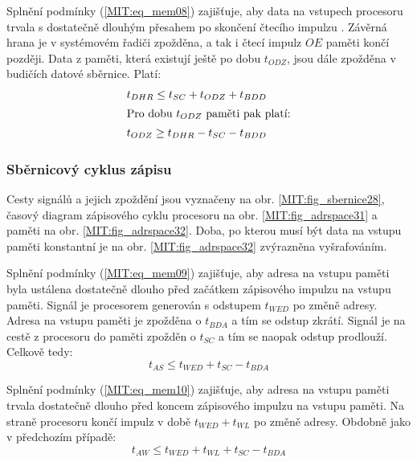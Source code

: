         Splnění podmínky (\ref{MIT:eq_mem08}) zajišťuje, aby data na vstupech procesoru trvala s 
        dostatečně dlouhým přesahem po skončení čtecího impulzu  . 
        Závěrná hrana  je v systémovém řadiči zpožděna, a tak i čtecí 
        impulz \(OE\) paměti končí později. Data z paměti, která existují ještě po dobu 
        \(t_{ODZ}\), jsou dále zpožděna v budičích datové sběrnice. Platí:
        \begin{align}
          t_{DHR} \leq t_{SC} + t_{ODZ} + t_{BDD} \label{MIT:eq_mem07}  \\
          \shortintertext{Pro dobu \(t_{ODZ}\) paměti pak platí:}
          t_{ODZ} \geq t_{DHR} - t_{SC} - t_{BDD} \label{MIT:eq_mem08}
        \end{align}

      \subsubsection{Sběrnicový cyklus zápisu}
        Cesty signálů a jejich zpoždění jsou vyznačeny na obr. \ref{MIT:fig_sbernice28}, časový 
        diagram zápisového cyklu procesoru na obr. \ref{MIT:fig_adrspace31} a paměti na obr. 
        \ref{MIT:fig_adrspace32}. Doba, po kterou musí být data na vstupu paměti konstantní je na 
        obr. \ref{MIT:fig_adrspace32} zvýrazněna vyšrafováním.
        
        Splnění podmínky (\ref{MIT:eq_mem09}) zajišťuje, aby adresa na vstupu paměti byla ustálena 
        dostatečně dlouho před začátkem zápisového impulzu na vstupu  
        paměti. Signál  je procesorem generován s odstupem \(t_{WED}\) po 
        změně adresy. Adresa na vstupu paměti je zpožděna o \(t_{BDA}\) a tím se odstup zkrátí. 
        Signál  je na cestě z procesoru do paměti zpožděn o \(t_{SC}\) a 
        tím se naopak odstup prodlouží. Celkově tedy:
        \begin{equation}\label{MIT:eq_mem09}
          t_{AS} \leq t_{WED} + t_{SC} - t_{BDA} 
        \end{equation}
        
        Splnění podmínky (\ref{MIT:eq_mem10}) zajišťuje, aby adresa na vstupu paměti trvala 
        dostatečně dlouho před koncem zápisového impulzu na vstupu  
        paměti. Na straně procesoru končí impulz v době \(t_{WED} + t_{WL}\) po změně adresy. 
        Obdobně jako v předchozím případě:
        \begin{equation}\label{MIT:eq_mem10}
          t_{AW} \leq t_{WED} + t_{WL} + t_{SC} - t_{BDA} 
        \end{equation}
        
